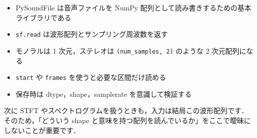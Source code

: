 \begin{itemize}
\item PySoundFile は音声ファイルを NumPy 配列として読み書きするための基本ライブラリである
\item \texttt{sf.read} は波形配列とサンプリング周波数を返す
\item モノラルは 1 次元，ステレオは \texttt{(num\_samples, 2)} のような 2 次元配列になる
\item \texttt{start} や \texttt{frames} を使うと必要な区間だけ読める
\item 保存時は dtype，shape，samplerate を意識して検証する
\end{itemize}

次に STFT やスペクトログラムを扱うときも，入力は結局この波形配列です．
そのため，「どういう shape と意味を持つ配列を読んでいるか」をここで曖昧にしないことが重要です．
